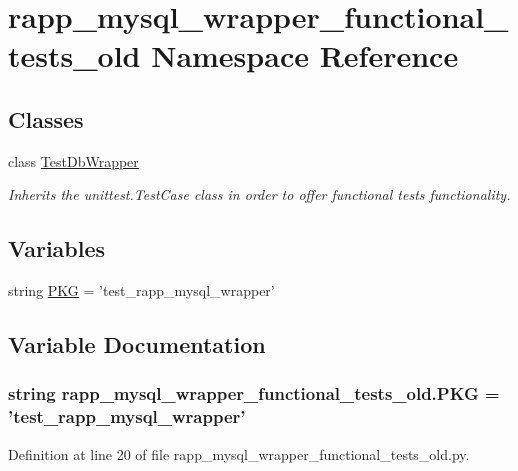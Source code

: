 \hypertarget{namespacerapp__mysql__wrapper__functional__tests__old}{\section{rapp\-\_\-mysql\-\_\-wrapper\-\_\-functional\-\_\-tests\-\_\-old Namespace Reference}
\label{namespacerapp__mysql__wrapper__functional__tests__old}
}
\subsection*{Classes}
\begin{DoxyCompactItemize}
\item 
class \hyperlink{classrapp__mysql__wrapper__functional__tests__old_1_1TestDbWrapper}{Test\-Db\-Wrapper}
\begin{DoxyCompactList}\small\item\em Inherits the unittest.\-Test\-Case class in order to offer functional tests functionality. \end{DoxyCompactList}\end{DoxyCompactItemize}
\subsection*{Variables}
\begin{DoxyCompactItemize}
\item 
string \hyperlink{namespacerapp__mysql__wrapper__functional__tests__old_ac7d45409a074684b151853bb2ab12d1c}{P\-K\-G} = 'test\-\_\-rapp\-\_\-mysql\-\_\-wrapper'
\end{DoxyCompactItemize}


\subsection{Variable Documentation}
\hypertarget{namespacerapp__mysql__wrapper__functional__tests__old_ac7d45409a074684b151853bb2ab12d1c}{
\subsubsection[{P\-K\-G}]{\setlength{\rightskip}{0pt plus 5cm}string rapp\-\_\-mysql\-\_\-wrapper\-\_\-functional\-\_\-tests\-\_\-old.\-P\-K\-G = 'test\-\_\-rapp\-\_\-mysql\-\_\-wrapper'}}\label{namespacerapp__mysql__wrapper__functional__tests__old_ac7d45409a074684b151853bb2ab12d1c}


Definition at line 20 of file rapp\-\_\-mysql\-\_\-wrapper\-\_\-functional\-\_\-tests\-\_\-old.\-py.

